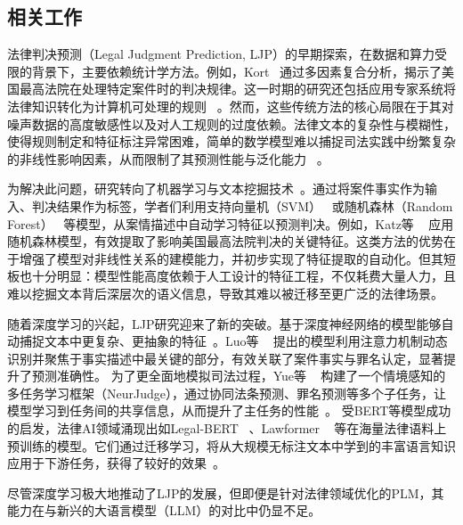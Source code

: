 \subsection{\heiti 相关工作}
法律判决预测（Legal Judgment Prediction, LJP）的早期探索，在数据和算力受限的背景下，主要依赖统计学方法。例如，Kort~\cite{kort1957predicting} 通过多因素复合分析，揭示了美国最高法院在处理特定案件时的判决规律。这一时期的研究还包括应用专家系统将法律知识转化为计算机可处理的规则 ~\cite{susskind1986expert}。然而，这些传统方法的核心局限在于其对噪声数据的高度敏感性以及对人工规则的过度依赖。法律文本的复杂性与模糊性，使得规则制定和特征标注异常困难，简单的数学模型难以捕捉司法实践中纷繁复杂的非线性影响因素，从而限制了其预测性能与泛化能力 ~\cite{deng2023syllogistic}。

为解决此问题，研究转向了机器学习与文本挖掘技术~\cite{chen2013text,goncalves2005evaluating}。通过将案件事实作为输入、判决结果作为标签，学者们利用支持向量机（SVM）~\cite{kianmehr2006crime} 或随机森林（Random Forest） ~\cite{sulea2017exploring}等模型，从案情描述中自动学习特征以预测判决。例如，Katz等 ~\cite{sulea2017exploring} 应用随机森林模型，有效提取了影响美国最高法院判决的关键特征。这类方法的优势在于增强了模型对非线性关系的建模能力，并初步实现了特征提取的自动化。但其短板也十分明显：模型性能高度依赖于人工设计的特征工程，不仅耗费大量人力，且难以挖掘文本背后深层次的语义信息，导致其难以被迁移至更广泛的法律场景。

随着深度学习的兴起，LJP研究迎来了新的突破。基于深度神经网络的模型能够自动捕捉文本中更复杂、更抽象的特征~\cite{cheng2025legal,dong2021legal,feng2022legal,jiang2018interpretable}。Luo等 ~\cite{huang2019improved} 提出的模型利用注意力机制动态识别并聚焦于事实描述中最关键的部分，有效关联了案件事实与罪名认定，显著提升了预测准确性。
为了更全面地模拟司法过程，Yue等 ~\cite{yue2021neurjudge} 构建了一个情境感知的多任务学习框架（NeurJudge），通过协同法条预测、罪名预测等多个子任务，让模型学习到任务间的共享信息，从而提升了主任务的性能~\cite{liu2019multi}。
受BERT等模型成功的启发，法律AI领域涌现出如Legal-BERT ~\cite{liu2021robustly,chalkidis2020legal,deepa2021bidirectional,devlin2019bert,fan2022multi}、Lawformer ~\cite{xiao2021lawformer,du2022glm,fei2023lawbench} 等在海量法律语料上预训练的模型。它们通过迁移学习，将从大规模无标注文本中学到的丰富语言知识应用于下游任务，获得了较好的效果~\cite{cui2021pre,houlsby2019parameter,hu2018few}。

尽管深度学习极大地推动了LJP的发展，但即便是针对法律领域优化的PLM，其能力在与新兴的大语言模型（LLM）的对比中仍显不足。

